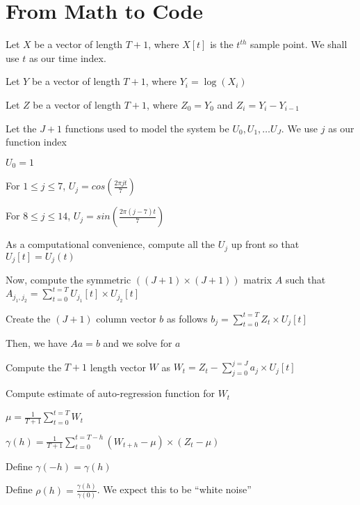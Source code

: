 \documentclass[12pt,timesnewroman,letterpaper]{article}
\begin{document}
\section{From Math to Code}
\bi
\item Let \(X\) be a vector of length \(T+1\), where \(X[t]\) is the \(t^{th}\)
sample point. We shall use \(t\) as our time index.
\item Let \(Y\) be a vector of length \(T+1\), where \(Y_i = \log(X_i)\)
\item Let \(Z\) be a vector of length \(T+1\), where 
\(Z_0 = Y_0\) and 
\(Z_i = Y_i - Y_{i-1}\)
\item 
Let the \(J+1\) functions used to model the system 
be \(U_0, U_1, \ldots U_J\). We use \(j\) as our
function index
\be
\item \(U_0 = 1\)
\item For \(1 \leq j \leq 7 \), \(U_j = cos(\frac{2 \pi j t}{7})\)
\item For \(8 \leq j \leq 14 \), \(U_j = sin(\frac{2 \pi (j-7) t}{7})\)
\ee
\item As a computational convenience, 
compute all the \(U_j\) up front so that \(U_j[t] = U_j(t)\)
\item Now, compute the symmetric \(((J+1) \times (J+1))\) matrix \(A\)
such that 
\(A_{j_1, j_2} = \sum_{t=0}^{t=T} U_{j_1}[t] \times U_{j_2}[t] \)
\item Create the \((J+1)\) column vector \(b\) as follows
\(b_j = \sum_{t=0}^{t=T} Z_t \times U_j[t]\)
\item Then, we have \(A a = b\) and we solve for \(a\)
\item Compute the \(T+1\) length vector \(W\) as 
\(W_t = Z_t - \sum_{j=0}^{j=J} a_j \times U_j[t]\) 
\item Compute estimate of auto-regression function for \(W_t\)
\item \(\mu = \frac{1}{T+1} \sum_{t=0}^{t=T} W_t\) 
\item \(\gamma(h) = \frac{1}{T+1} \sum_{t=0}^{t=T-h} 
(W_{t+h} - \mu) \times (Z_t - \mu)\)
\item Define \(\gamma(-h) = \gamma(h)\)
\item Define \(\rho(h) = \frac{\gamma(h)}{\gamma(0)}\). We expect this to be
``white noise''
\ei
\end{document}
